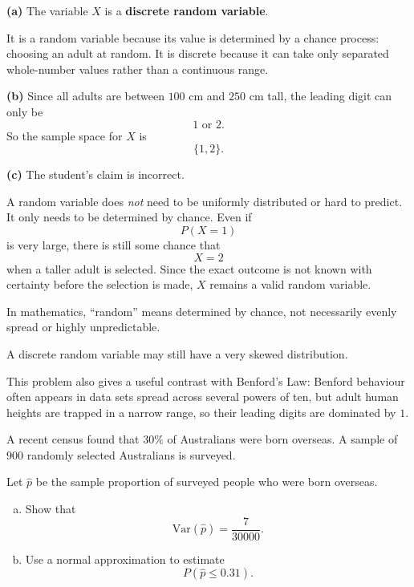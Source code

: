 \begin{solution}
\textbf{(a)} The variable $X$ is a \textbf{discrete random variable}.

It is a random variable because its value is determined by a chance process: choosing an adult at random. It is discrete because it can take only separated whole-number values rather than a continuous range.

\textbf{(b)} Since all adults are between $100$ cm and $250$ cm tall, the leading digit can only be
\[
1 \text{ or } 2.
\]
So the sample space for $X$ is
\[
\{1,2\}.
\]

\textbf{(c)} The student's claim is incorrect.

A random variable does \emph{not} need to be uniformly distributed or hard to predict. It only needs to be determined by chance. Even if
\[
P(X=1)
\]
is very large, there is still some chance that
\[
X=2
\]
when a taller adult is selected. Since the exact outcome is not known with certainty before the selection is made, $X$ remains a valid random variable.
\end{solution}

\begin{takeaways}
\item In mathematics, ``random'' means determined by chance, not necessarily evenly spread or highly unpredictable.
\item A discrete random variable may still have a very skewed distribution.
\item This problem also gives a useful contrast with Benford's Law: Benford behaviour often appears in data sets spread across several powers of ten, but adult human heights are trapped in a narrow range, so their leading digits are dominated by $1$.
\end{takeaways}

\begin{problem}
A recent census found that $30\%$ of Australians were born overseas. A sample of $900$ randomly selected Australians is surveyed.

Let $\hat p$ be the sample proportion of surveyed people who were born overseas.
\begin{enumerate}[(a)]
  \item Show that
  \[
  \mathrm{Var}(\hat p)=\frac{7}{30000}.
  \]
  \item Use a normal approximation to estimate
  \[
  P(\hat p\le 0.31).
  \]
\end{enumerate}
\end{problem}

